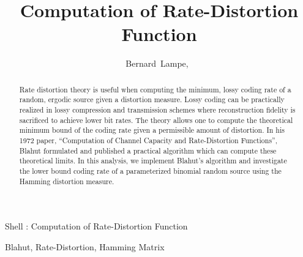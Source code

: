 \documentclass[journal]{IEEEtran}
\begin{document}
\title{Computation of Rate-Distortion Function}

\author{Bernard~Lampe,~}

{Shell \MakeLowercase{\Lampe}: Computation of Rate-Distortion Function}

\maketitle

\begin{abstract} Rate distortion theory is useful when computing the minimum, lossy coding rate of a random, ergodic source given a distortion measure. Lossy coding can be practically realized in lossy compression and transmission schemes where reconstruction fidelity is sacrificed to achieve lower bit rates. The theory allows one to compute the theoretical minimum bound of the coding rate given a permissible amount of distortion. In his 1972 paper, ``Computation of Channel Capacity and Rate-Distortion Functions'', Blahut formulated and published a practical algorithm which can compute these theoretical limits. In this analysis, we implement Blahut's algorithm and investigate the lower bound coding rate of a parameterized binomial random source using the Hamming distortion measure.
\end{abstract}

\begin{IEEEkeywords}
Blahut, Rate-Distortion, Hamming Matrix
\end{IEEEkeywords}

\end{document}
